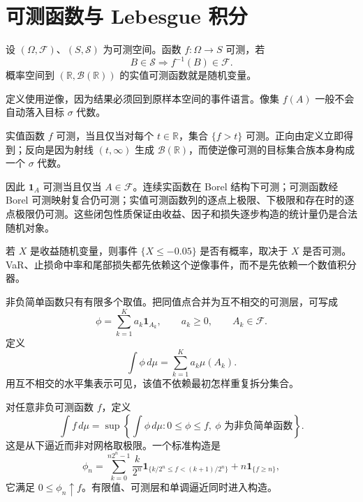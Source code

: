 \section{可测函数与 Lebesgue 积分}

\begin{definition}[可测函数]
设 $(\Omega,\mathcal F)$、$(S,\mathcal S)$ 为可测空间。函数 $f:\Omega\to S$ 可测，若
\[
 B\in\mathcal S\Longrightarrow f^{-1}(B)\in\mathcal F.
\]
概率空间到 $(\mathbb R,\mathcal B(\mathbb R))$ 的实值可测函数就是随机变量。
\end{definition}

定义使用逆像，因为结果必须回到原样本空间的事件语言。像集 $f(A)$ 一般不会自动落入目标 $\sigma$ 代数。


实值函数 $f$ 可测，当且仅当对每个 $t\in\mathbb R$，集合 $\{f>t\}$ 可测。正向由定义立即得到；反向是因为射线 $(t,\infty)$ 生成 $\mathcal B(\mathbb R)$，而使逆像可测的目标集合族本身构成一个 $\sigma$ 代数。

因此 $\mathbf1_A$ 可测当且仅当 $A\in\mathcal F$。连续实函数在 Borel 结构下可测；可测函数经 Borel 可测映射复合仍可测；实值可测函数列的逐点上极限、下极限和存在时的逐点极限仍可测。这些闭包性质保证由收益、因子和损失逐步构造的统计量仍是合法随机对象。

\begin{example}
若 $X$ 是收益随机变量，则事件 $\{X\leq-0.05\}$ 是否有概率，取决于 $X$ 是否可测。VaR、止损命中率和尾部损失都先依赖这个逆像事件，而不是先依赖一个数值积分器。
\end{example}


非负简单函数只有有限多个取值。把同值点合并为互不相交的可测层，可写成
\[
 \phi=\sum_{k=1}^{K}a_k\mathbf1_{A_k},
 \qquad a_k\geq0,\qquad A_k\in\mathcal F.
\]
定义
\[
 \int\phi\,d\mu=\sum_{k=1}^{K}a_k\mu(A_k).
\]
用互不相交的水平集表示可见，该值不依赖最初怎样重复拆分集合。



对任意非负可测函数 $f$，定义
\[
 \int f\,d\mu
 =\sup\left\{\int\phi\,d\mu:
 0\leq\phi\leq f,\ \phi\text{ 为非负简单函数}\right\}.
\]
这是从下逼近而非对网格取极限。一个标准构造是
\[
 \phi_n=
 \sum_{k=0}^{n2^n-1}\frac{k}{2^n}
 \mathbf1_{\{k/2^n\leq f<(k+1)/2^n\}}
 +n\mathbf1_{\{f\geq n\}},
\]
它满足 $0\leq\phi_n\uparrow f$。有限值、可测层和单调逼近同时进入构造。


